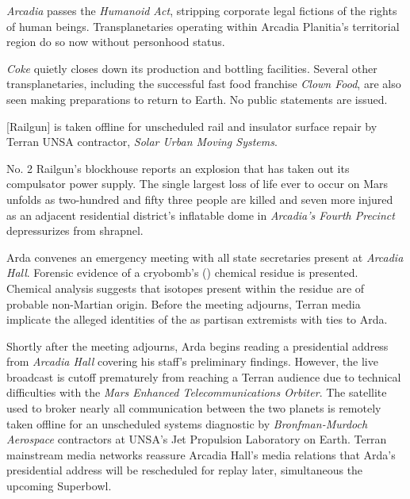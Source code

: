 {\it Arcadia} passes the {\it Humanoid Act}, stripping corporate legal fictions of the rights of human beings. Transplanetaries operating within Arcadia Planitia's territorial region do so now without personhood status.
\StopTimelineDate

{\it Coke} quietly closes down its production and bottling facilities. Several other transplanetaries, including the successful fast food franchise {\it Clown Food}, are also seen making preparations to return to Earth. No public statements are issued.
\StopTimelineDate

[Railgun] is taken offline for unscheduled rail and insulator surface repair by Terran UNSA contractor, {\it Solar Urban Moving Systems}.
\StopTimelineDate

No. \type{#}2 Railgun's blockhouse reports an explosion that has taken out its compulsator power supply. The single largest loss of life ever to occur on Mars unfolds as two-hundred and fifty three people are killed and seven more injured as an adjacent residential district's inflatable dome in {\it Arcadia's Fourth Precinct} depressurizes from shrapnel.

Arda convenes an emergency meeting with all state secretaries present at {\it Arcadia Hall}. Forensic evidence of a cryobomb's () chemical residue is presented. Chemical analysis suggests that isotopes present within the residue are of probable non-Martian origin. Before the meeting adjourns, Terran media implicate the alleged identities of the  as partisan extremists with ties to Arda. 

Shortly after the meeting adjourns, Arda begins reading a presidential address from {\it Arcadia Hall} covering his staff's preliminary findings. However, the live broadcast is cutoff prematurely from reaching a Terran audience due to technical difficulties with the {\it Mars Enhanced Telecommunications Orbiter}. The satellite used to broker nearly all communication between the two planets is remotely taken offline for an unscheduled systems diagnostic by {\it Bronfman-Murdoch Aerospace} contractors at UNSA's Jet Propulsion Laboratory on Earth. Terran mainstream media networks reassure Arcadia Hall's media relations that Arda's presidential address will be rescheduled for replay later, simultaneous the upcoming Superbowl.

